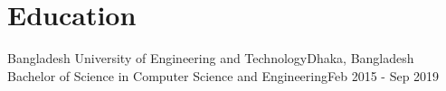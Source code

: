 \section{Education}
\resumeSubheading
  {Bangladesh University of Engineering and Technology}{Dhaka, Bangladesh}
  {Bachelor of Science in Computer Science and Engineering}{Feb 2015 - Sep 2019}
